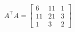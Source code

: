\documentclass[preview]{standalone}
\begin{document}
\begin{align*}
A^\top A=\left[\begin{matrix}6&11&1\\11&21&3\\1&3&2\end{matrix}\right]
\end{align*}
\end{document}
